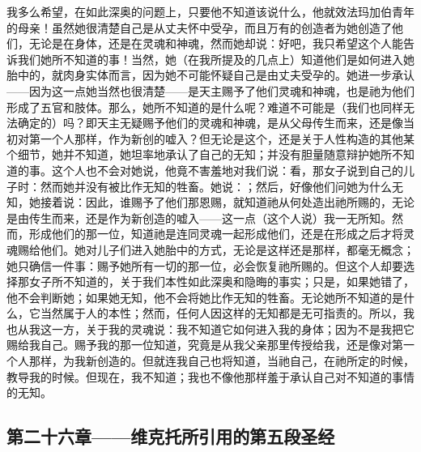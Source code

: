 我多么希望，在如此深奥的问题上，只要他不知道该说什么，他就效法玛加伯青年的母亲！虽然她很清楚自己是从丈夫怀中受孕，而且万有的创造者为她创造了他们，无论是在身体，还是在灵魂和神魂，然而她却说：好吧，我只希望这个人能告诉我们她所不知道的事！当然，她（在我所提及的几点上）知道他们是如何进入她胎中的，就肉身实体而言，因为她不可能怀疑自己是由丈夫受孕的。她进一步承认——因为这一点她当然也很清楚——是天主赐予了他们灵魂和神魂，也是祂为他们形成了五官和肢体。那么，她所不知道的是什么呢？难道不可能是（我们也同样无法确定的）吗？即天主无疑赐予他们的灵魂和神魂，是从父母传生而来，还是像当初对第一个人那样，作为新创的嘘入？但无论是这个，还是关于人性构造的其他某个细节，她并不知道，她坦率地承认了自己的无知；并没有胆量随意辩护她所不知道的事。这个人也不会对她说，他竟不害羞地对我们说：看，那女子说到自己的儿子时：然而她并没有被比作无知的牲畜。她说：；然后，好像他们问她为什么无知，她接着说：因此，谁赐予了他们那恩赐，就知道祂从何处造出祂所赐的，无论是由传生而来，还是作为新创造的嘘入——这一点（这个人说）我一无所知。然而，形成他们的那一位，知道祂是连同灵魂一起形成他们，还是在形成之后才将灵魂赐给他们。她对儿子们进入她胎中的方式，无论是这样还是那样，都毫无概念；她只确信一件事：赐予她所有一切的那一位，必会恢复祂所赐的。但这个人却要选择那女子所不知道的，关于我们本性如此深奥和隐晦的事实；只是，如果她错了，他不会判断她；如果她无知，他不会将她比作无知的牲畜。无论她所不知道的是什么，它当然属于人的本性；然而，任何人因这样的无知都是无可指责的。所以，我也从我这一方，关于我的灵魂说：我不知道它如何进入我的身体；因为不是我把它赐给我自己。赐予我的那一位知道，究竟是从我父亲那里传授给我，还是像对第一个人那样，为我新创造的。但就连我自己也将知道，当祂自己，在祂所定的时候，教导我的时候。但现在，我不知道；我也不像他那样羞于承认自己对不知道的事情的无知。\par


\subsection{第二十六章——维克托所引用的第五段圣经}

